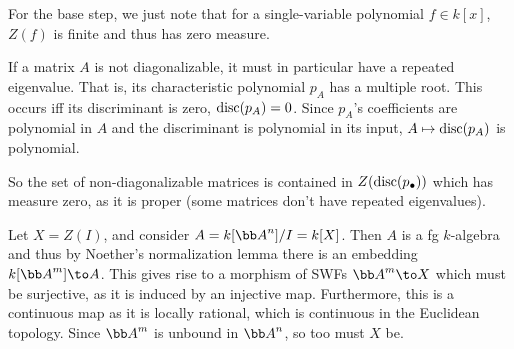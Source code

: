     For the base step, we just note that for a single-variable polynomial $f\in k[x]$, $Z(f)$ is finite and thus has
    zero measure.

    \item If a matrix $A$ is not diagonalizable, it must in particular have a repeated eigenvalue.
    That is, its characteristic polynomial $p_A$ has a multiple root.
    This occurs iff its discriminant is zero, ${\rm disc}(p_A)=0$.
    Since $p_A$'s coefficients are polynomial in $A$ and the discriminant is polynomial in its input, $A\mapsto{\rm disc}(p_A)$
    is polynomial.

    So the set of non-diagonalizable matrices is contained in $Z({\rm disc}(p_\bullet))$ which has measure zero, as it is proper
    (some matrices don't have repeated eigenvalues).

    \item Let $X=Z(I)$, and consider $A=k[\bA^n]/I=k[X]$.
    Then $A$ is a fg $k$-algebra and thus by Noether's normalization lemma there is an embedding $k[\bA^m]\to A$.
    This gives rise to a morphism of SWFs $\bA^m\to X$ which must be surjective, as it is induced by an injective map.
    Furthermore, this is a continuous map as it is locally rational, which is continuous in the Euclidean topology.
    Since $\bA^m$ is unbound in $\bA^n$, so too must $X$ be.
\eenum

\bye

